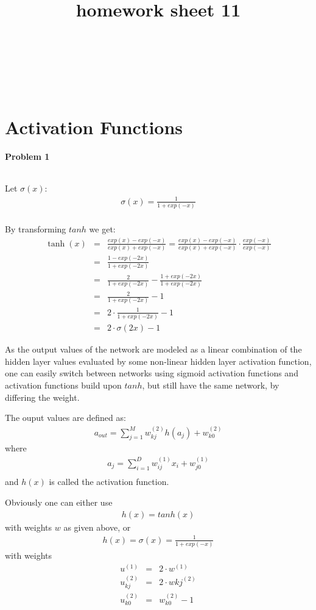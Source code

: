 \documentclass{article}
\title{homework sheet 11}
\author{
\name{Andre Seitz}\\
\imat{03622870}\\
\email{andre.seitz@mytum.de}
\And
\name{Linda Leidig} \\
\imat{03608416}\\
\email{linda.leidig@tum.de}
}
\begin{document}
\maketitle

\section{Activation Functions}

\paragraph*{Problem 1}
$\;$ 

Let $\sigma(x)$:
\begin{eqnarray}
\sigma(x) = \frac{1}{1+exp(-x)} \\
\end{eqnarray}

By transforming $tanh$ we get:
\begin{eqnarray}
\tanh(x) &=& \frac{exp(x) - exp(-x)}{exp(x) + exp(-x)}  = \frac{exp(x) - exp(-x)}{exp(x) + exp(-x)} \cdot \frac{exp(-x)}{exp(-x)}\\
&=& \frac{1 - exp(-2x)}{1 + exp(-2x)} \\
&=& \frac{2}{1 + exp(-2x)} - \frac{1 + exp(-2x)}{1+exp(-2x)} \\
&=& \frac{2}{1 + exp(-2x)} -1 \\
&=& 2 \cdot \frac{1}{1 + exp(-2x)} -1\\
&=& 2 \cdot \sigma(2x) -1
\end{eqnarray}
 
As the output values of the network are modeled as a linear combination of the hidden layer values evaluated by some non-linear hidden layer activation function, one can easily switch between networks using sigmoid activation functions and activation functions build upon $tanh$, but still have the same network, by differing the weight.

The ouput values are defined as:
\begin{eqnarray}
a_{out} = \sum_{j=1}^{M} w_{kj}^{(2)} h(a_j) + w_{k0}^{(2)}
\end{eqnarray}
where
\begin{eqnarray}
a_j = \sum_{i=1}^D w_{ij}^{(1)} x_i + w_{j0}^{(1)}\\
\end{eqnarray}
and $h(x)$ is called the activation function.

Obviously one can either use 
\begin{eqnarray}
h(x) = tanh(x)
\end{eqnarray}
with weights $w$ as given above, or
\begin{eqnarray}
h(x) = \sigma(x) = \frac{1}{1 + exp(-x)}
\end{eqnarray}
with weights
\begin{eqnarray}
u^{(1)} &=& 2 \cdot w^{(1)}\\
u_{kj}^{(2)} &=& 2\cdot w{kj}^{(2)}\\
u_{k0}^{(2)} &=& w_{k0}^{(2)}-1
\end{eqnarray}
\end{document}
